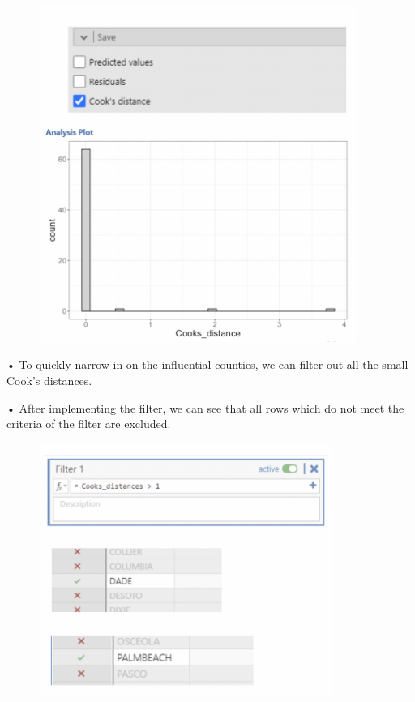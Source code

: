 \documentclass[
  letterpaper,
  DIV=11,
  numbers=noendperiod]{scrreprt}
\begin{document}
\begin{figure}

{\centering \includegraphics[width=4.09375in,height=\textheight]{images/mod4_pt1_19.png}

}

\end{figure}

• To quickly narrow in on the influential counties, we can filter out
all the small Cook's distances.

• After implementing the filter, we can see that all rows which do not
meet the criteria of the filter are excluded.

\begin{figure}

{\centering \includegraphics[width=3.78125in,height=\textheight]{images/mod4_pt1_20.png}

}

\end{figure}
\end{document}
